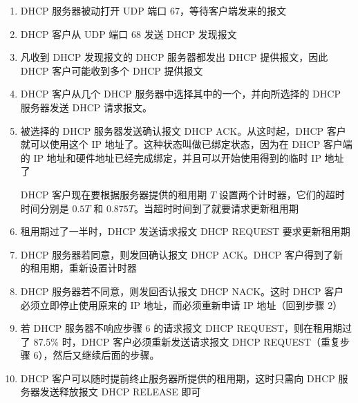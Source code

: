 \documentclass[cs4size,a4paper,10pt]{ctexart}
\begin{document}
	\begin{enumerate}[label=\arabic*.]
		\item DHCP 服务器被动打开 UDP 端口 67，等待客户端发来的报文
		\item DHCP 客户从 UDP 端口 68 发送 DHCP 发现报文
		\item 凡收到 DHCP 发现报文的 DHCP 服务器都发出 DHCP 提供报文，因此 DHCP 客户可能收到多个 DHCP 提供报文
		\item DHCP 客户从几个 DHCP 服务器中选择其中的一个，并向所选择的 DHCP 服务器发送 DHCP 请求报文。
		\item 被选择的 DHCP 服务器发送确认报文 DHCP ACK。从这时起，DHCP 客户就可以使用这个 IP 地址了。这种状态叫做已绑定状态，因为在 DHCP 客户端的 IP 地址和硬件地址已经完成绑定，并且可以开始使用得到的临时 IP 地址了
		
		DHCP 客户现在要根据服务器提供的租用期 $T$ 设置两个计时器，它们的超时时间分别是 $0.5T$ 和 $0.875T$。当超时时间到了就要请求更新租用期
		
		\item 租用期过了一半时，DHCP 发送请求报文 DHCP REQUEST 要求更新租用期
		
		\item DHCP 服务器若同意，则发回确认报文 DHCP ACK。DHCP 客户得到了新的租用期，重新设置计时器
		
		\item DHCP 服务器若不同意，则发回否认报文 DHCP NACK。这时 DHCP 客户必须立即停止使用原来的 IP 地址，而必须重新申请 IP 地址（回到步骤 2）
		
		\item 若 DHCP 服务器不响应步骤 6 的请求报文 DHCP REQUEST，则在租用期过了 87.5\% 时，DHCP 客户必须重新发送请求报文 DHCP REQUEST（重复步骤 6），然后又继续后面的步骤。
		
		\item DHCP 客户可以随时提前终止服务器所提供的租用期，这时只需向 DHCP 服务器发送释放报文 DHCP RELEASE 即可
	\end{enumerate}
\end{document}
